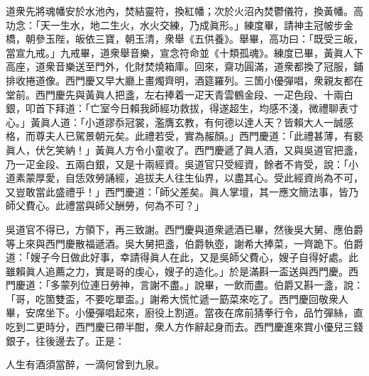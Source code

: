 道衆先將魂幡安於水池內，焚結靈符，換紅幡；次於火沼內焚鬱儀符，換黃幡。高功念：「天一生水，地二生火，水火交練，乃成眞形。」練度畢，請神主冠帔步金橋，朝參玉陛，皈依三寶，朝玉清，衆舉《五供養》。舉畢，高功曰：「既受三皈，當宣九戒。」九戒畢，道衆舉音樂，宣念符命並《十類孤魂》。練度已畢，黃眞人下高座，道衆音樂送至門外，化財焚燒箱庫。回來，齋功圓滿，{}道衆都換了冠服，鋪排收捲道像。西門慶又早大廳上畫燭齊明，酒筵羅列。三箇小優彈唱，衆親友都在堂前。西門慶先與黃眞人把盞，左右捧着一疋天青雲鶴金段、一疋色段、十兩白銀，叩首下拜道：「亡室今日賴我師經功救拔，得遂超生，均感不淺，微禮聊表寸心。」黃眞人道：「小道謬忝冠裳，濫膺玄教，有何德以達人天？皆賴大人一誠感格，而尊夫人已駕景朝元矣。此禮若受，實為赧顏。」西門慶道：「此禮甚薄，有褻眞人，伏乞笑納！」黃眞人方令小童收了。西門慶遞了眞人酒，又與吳道官把盞，乃一疋金段、五兩白銀，又是十兩經資。吳道官只受經資，餘者不肯受，說：「小道素蒙厚愛，自恁效勞誦經，追拔夫人往生仙界，以盡其心。受此經資尚為不可，又豈敢當此盛禮乎！」西門慶道：「師父差矣。眞人掌壇，其一應文簡法事，皆乃師父費心。此禮當與師父酬勞，何為不可？」

吳道官不得已，方領下，再三致謝。西門慶與道衆遞酒已畢，然後吳大舅、應伯爵等上來與西門慶散福遞酒。吳大舅把盞，伯爵執壺，謝希大捧菜，一齊跪下。伯爵道：「嫂子今日做此好事，幸請得眞人在此，又是吳師父費心，嫂子自得好處。此雖賴眞人追薦之力，實是哥的虔心，嫂子的造化。」於是滿斟一盃送與西門慶。西門慶道：「多蒙列位連日勞神，言謝不盡。」{}說畢，一飲而盡。伯爵又斟一盞，說：「哥，吃箇雙盃，不要吃單盃。」謝希大慌忙遞一筯菜來吃了。西門慶回敬衆人畢，安席坐下。小優彈唱起來，廚役上割道。當夜在席前猜拳行令，品竹彈絲，直吃到二更時分，西門慶已帶半酣，衆人方作辭起身而去。西門慶進來賞小優兒三錢銀子，往後邊去了。正是：

\begin{myquote}
人生有酒須當醉，一滴何曾到九泉。
\end{myquote}

